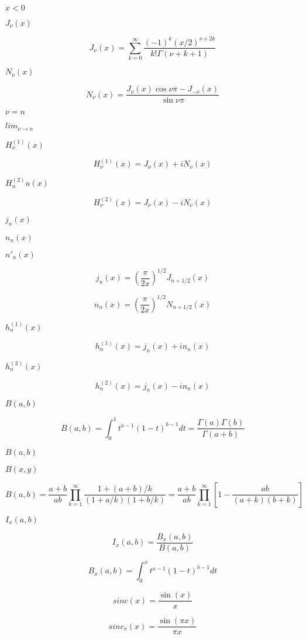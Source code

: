 \documentclass{article}
\begin{document}
$ x < 0 $
\pagebreak

$ J_{\nu}(x) $
\pagebreak

\[ J_{\nu}(x) = \sum_{k=0}^{\infty} \frac{(-1)^k (x/2)^{\nu + 2k}}{k!\Gamma(\nu+k+1)} \]
\pagebreak

$ N_{\nu}(x) $
\pagebreak

\[ N_{\nu}(x) = \frac{J_{\nu}(x) \cos \nu\pi - J_{-\nu}(x)} {\sin \nu\pi} \]
\pagebreak

$ \nu = n $
\pagebreak

$ lim_{\nu \to n} $
\pagebreak

$ H^{(1)}_\nu(x) $
\pagebreak

\[ H^{(1)}_\nu(x) = J_\nu(x) + i N_\nu(x) \]
\pagebreak

$ H^{(2)}_nu(x) $
\pagebreak

\[ H^{(2)}_\nu(x) = J_\nu(x) - i N_\nu(x) \]
\pagebreak

$ j_n(x) $
\pagebreak

$ n_n(x) $
\pagebreak

$ n'_n(x) $
\pagebreak

\[ j_n(x) = \left(\frac{\pi}{2x} \right) ^{1/2} J_{n+1/2}(x) \]
\pagebreak

\[ n_n(x) = \left(\frac{\pi}{2x} \right) ^{1/2} N_{n+1/2}(x) \]
\pagebreak

$ h^{(1)}_n(x) $
\pagebreak

\[ h^{(1)}_n(x) = j_n(x) + i n_n(x) \]
\pagebreak

$ h^{(2)}_n(x) $
\pagebreak

\[ h^{(2)}_n(x) = j_n(x) - i n_n(x) \]
\pagebreak

$ B(a,b) $
\pagebreak

\[ B(a,b) = \int_0^1 t^{a - 1} (1 - t)^{b - 1} dt = \frac{\Gamma(a)\Gamma(b)}{\Gamma(a+b)} \]
\pagebreak

$B(a,b)$
\pagebreak

$B(x,y)$
\pagebreak

\[ B(a,b) = \frac{a + b}{a b} \prod_{k=1}^{\infty} \frac{1 + (a + b) / k}{(1 + a / k) (1 + b / k)} = \frac{a + b}{ab} \prod_{k=1}^{\infty} \left[1 - \frac{ab}{(a + k)(b + k)}\right] \]
\pagebreak

$ I_x(a,b) $
\pagebreak

\[ I_x(a,b) = \frac{B_x(a,b)}{B(a,b)} \]
\pagebreak

\[ B_x(a,b) = \int_0^x t^{a - 1} (1 - t)^{b - 1} dt \]
\pagebreak

\[ sinc(x) = \frac{\sin(x)}{x} \]
\pagebreak

\[ sinc_\pi(x) = \frac{\sin(\pi x)}{\pi x} \]
\pagebreak
\end{document}
